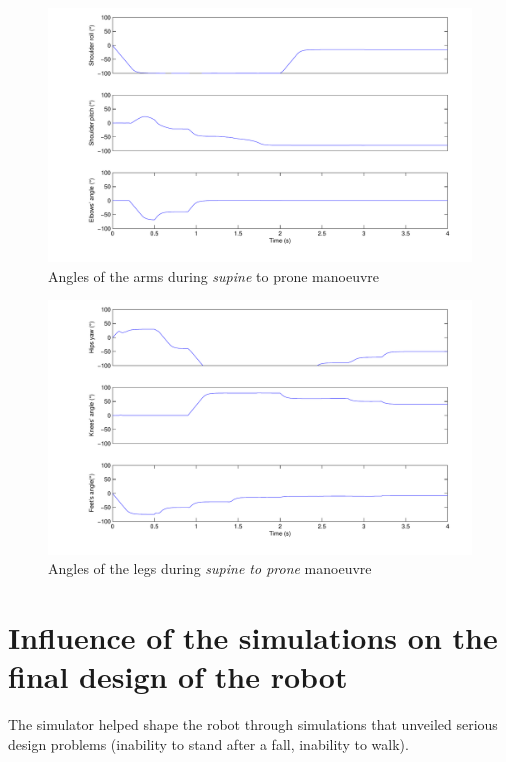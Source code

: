 \begin{figure}[htp]
\centering
    \includegraphics[width = \textwidth]{figures/prone2standArms}
    \caption[Angles of the arms during \emph{supine} to prone manoeuvre]{Angles of the arms during \emph{supine} to prone manoeuvre}
    \label{fig:prone2standArms}
\end{figure}

\begin{figure}[htp]
\centering
    \includegraphics[width = \textwidth]{figures/prone2standLegs}
    \caption[Angles of the legs during \emph{supine to prone} manoeuvre]{Angles of the legs during \emph{supine to prone} manoeuvre}
    \label{fig:prone2standLegs}
\end{figure}

\section{Influence of the simulations on the final design of the robot}
The simulator helped shape the robot through simulations that unveiled serious design problems (inability to stand after a fall, inability to walk).

